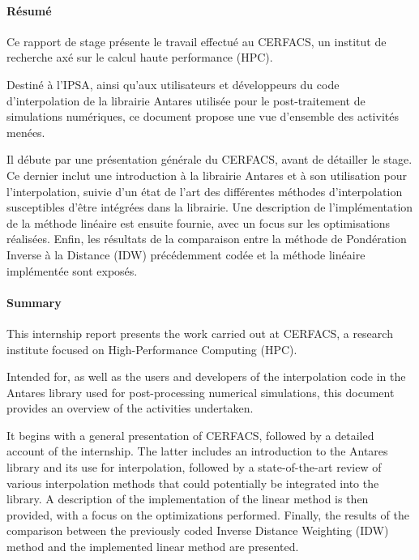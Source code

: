 
\cleardoublepage

\paragraph{Résumé}

\vspace{0,5cm}

Ce rapport de stage présente le travail effectué au CERFACS, un institut de recherche axé sur le calcul haute performance (HPC).

Destiné à l'IPSA, ainsi qu'aux utilisateurs et développeurs du code d'interpolation de la librairie Antares utilisée pour le post-traitement de simulations numériques, ce document propose une vue d'ensemble des activités menées.

Il débute par une présentation générale du CERFACS, avant de détailler le stage.
Ce dernier inclut une introduction à la librairie Antares et à son utilisation pour l'interpolation, suivie d'un état de l'art des différentes méthodes d'interpolation susceptibles d'être intégrées dans la librairie.
Une description de l'implémentation de la méthode linéaire est ensuite fournie, avec un focus sur les optimisations réalisées.
Enfin, les résultats de la comparaison entre la méthode de Pondération Inverse à la Distance (IDW) précédemment codée et la méthode linéaire implémentée sont exposés.

\paragraph{Summary}

\vspace{0,5cm}

This internship report presents the work carried out at CERFACS, a research institute focused on High-Performance Computing (HPC).

Intended for, as well as the users and developers of the interpolation code in the Antares library used for post-processing numerical simulations, this document provides an overview of the activities undertaken.

It begins with a general presentation of CERFACS, followed by a detailed account of the internship.
The latter includes an introduction to the Antares library and its use for interpolation, followed by a state-of-the-art review of various interpolation methods that could potentially be integrated into the library.
A description of the implementation of the linear method is then provided, with a focus on the optimizations performed.
Finally, the results of the comparison between the previously coded Inverse Distance Weighting (IDW) method and the implemented linear method are presented.